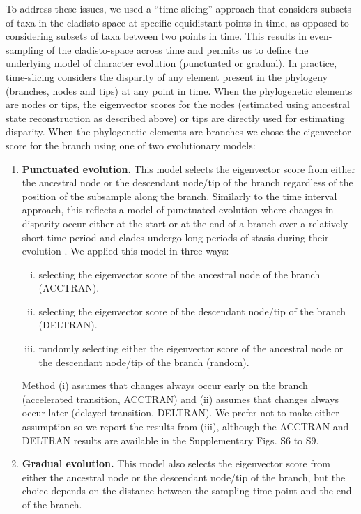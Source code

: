 \documentclass[12pt,letterpaper]{article}
\begin{document}
To address these issues, we used a ``time-slicing'' approach that considers subsets of taxa in the cladisto-space at specific equidistant points in time, as opposed to considering subsets of taxa between two points in time.
This results in even-sampling of the cladisto-space across time and permits us to define the underlying model of character evolution (punctuated or gradual).  
In practice, time-slicing considers the disparity of any element present in the phylogeny (branches, nodes and tips) at any point in time.
When the phylogenetic elements are nodes or tips, the eigenvector scores for the nodes (estimated using ancestral state reconstruction as described above) or tips are directly used for estimating disparity.
When the phylogenetic elements are branches we chose the eigenvector score for the branch using one of two evolutionary models:
\begin{enumerate}
    \item{\textbf{Punctuated evolution.}} 
    This model selects the eigenvector score from either the ancestral node or the descendant node/tip of the branch regardless of the position of the subsample along the branch. 
    Similarly to the time interval approach, this reflects a model of punctuated evolution where changes in disparity occur either at the start or at the end of a branch over a relatively short time period and clades undergo long periods of stasis during their evolution \cite{Gould1977,Hunt21042015}.
    We applied this model in three ways: 
    \begin{enumerate}[(i)]
      \item selecting the eigenvector score of the ancestral node of the branch (ACCTRAN).
      \item selecting the eigenvector score of the descendant node/tip of the branch (DELTRAN).
      \item randomly selecting either the eigenvector score of the ancestral node or the descendant node/tip of the branch (random).
    \end{enumerate}
    Method (i) assumes that changes always occur early on the branch (accelerated transition, ACCTRAN) and (ii) assumes that changes always occur later (delayed transition, DELTRAN).
    We prefer not to make either assumption so we report the results from (iii), although the ACCTRAN and DELTRAN results are available in the Supplementary Figs. S6 to S9.
    \item{\textbf{Gradual evolution.}}
    This model also selects the eigenvector score from either the ancestral node or the descendant node/tip of the branch, but the choice depends on the distance between the sampling time point and the end of the branch.

\end{enumerate}
\end{document}
